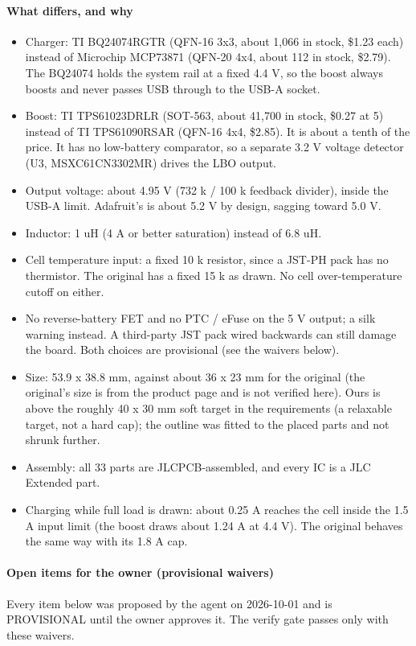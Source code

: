 \documentclass[11pt]{article}
\begin{document}
\paragraph*{What differs, and why}
\begin{itemize}
\item Charger: TI BQ24074RGTR (QFN-16 3x3, about 1,066 in stock, \$1.23 each) instead of Microchip MCP73871 (QFN-20 4x4, about 112 in stock, \$2.79). The BQ24074 holds the system rail at a fixed 4.4 V, so the boost always boosts and never passes USB through to the USB-A socket.
\item Boost: TI TPS61023DRLR (SOT-563, about 41,700 in stock, \$0.27 at 5) instead of TI TPS61090RSAR (QFN-16 4x4, \$2.85). It is about a tenth of the price. It has no low-battery comparator, so a separate 3.2 V voltage detector (U3, MSXC61CN3302MR) drives the LBO output.
\item Output voltage: about 4.95 V (732 k / 100 k feedback divider), inside the USB-A limit. Adafruit's is about 5.2 V by design, sagging toward 5.0 V.
\item Inductor: 1 uH (4 A or better saturation) instead of 6.8 uH.
\item Cell temperature input: a fixed 10 k resistor, since a JST-PH pack has no thermistor. The original has a fixed 15 k as drawn. No cell over-temperature cutoff on either.
\item No reverse-battery FET and no PTC / eFuse on the 5 V output; a silk warning instead. A third-party JST pack wired backwards can still damage the board. Both choices are provisional (see the waivers below).
\item Size: 53.9 x 38.8 mm, against about 36 x 23 mm for the original (the original's size is from the product page and is not verified here). Ours is above the roughly 40 x 30 mm soft target in the requirements (a relaxable target, not a hard cap); the outline was fitted to the placed parts and not shrunk further.
\item Assembly: all 33 parts are JLCPCB-assembled, and every IC is a JLC Extended part.
\item Charging while full load is drawn: about 0.25 A reaches the cell inside the 1.5 A input limit (the boost draws about 1.24 A at 4.4 V). The original behaves the same way with its 1.8 A cap.
\end{itemize}
\paragraph*{Open items for the owner (provisional waivers)}
Every item below was proposed by the agent on 2026-10-01 and is PROVISIONAL until the owner approves it. The verify gate passes only with these waivers.
\end{document}

